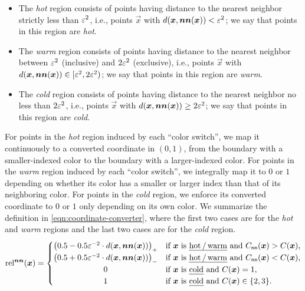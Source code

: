 \begin{itemize}[itemsep=0.2em,topsep=0.5em]
    \item The {\em hot} region consists of points having distance to the nearest neighbor strictly less than $\varepsilon^2$, i.e., points $\vec{x}$ with $d(\boldsymbol{x}, \operatorname*{\boldsymbol{nn}}(\boldsymbol{x}))<\varepsilon^2$; we say that points in this region are {\em hot}.
    \item The {\em warm} region consists of points having distance to the nearest neighbor between $\varepsilon^2$ (inclusive) and $2\varepsilon^2$ (exclusive), i.e., points $\vec{x}$ with $d(\boldsymbol{x}, \operatorname*{\boldsymbol{nn}}(\boldsymbol{x}))\in [\varepsilon^2,2\varepsilon^2)$; we say that points in this region are {\em warm}.
    \item The {\em cold} region consists of points having distance to the nearest neighbor no less than $2\varepsilon^2$, i.e., points $\vec{x}$ with $d(\boldsymbol{x}, \operatorname*{\boldsymbol{nn}}(\boldsymbol{x}))\geq 2\varepsilon^2$; we say that points in this region are {\em cold}.
\end{itemize}
For points in the {\em hot} region induced by each ``color switch'', 
we map it continuously to a converted coordinate in $(0,1)$, from the boundary with a smaller-indexed color to the boundary with a larger-indexed color.
For points in the {\em warm} region induced by each ``color switch'', we integrally map it to $0$ or $1$ depending on whether its color has a smaller or larger index than that of its neighboring color.
For points in the {\em cold} region, we enforce its converted coordinate to $0$ or $1$ only depending on its own color. 
We summarize the definition in \cref{eqn:coordinate-converter}, where the first two cases are for the {\em hot} and {\em warm} regions and the last two cases are for the {\em cold} region.
\begin{align}
    \label{eqn:coordinate-converter}
    \rel(\vec{x}) = \begin{cases}
        \hfill \left(0.5 - 0.5\eps^{-2} \cdot d(\vec{x}, \vec{nn}(\vec{x}))
        \right)_+ \hfill & \text{if $\vec{x}$ is {\em hot\,/\,warm} and $C_{\sf nn}(\vec{x})>C(\vec{x})$,}\\
        \left(0.5 + 0.5\eps^{-2} \cdot d(\vec{x}, \vec{nn}(\vec{x}))\right)_- & \text{if $\vec{x}$ is {\em hot\,/\,warm} and $C_{\sf nn}(\vec{x})<C(\vec{x})$,}\\
        \hfill 0 \hfill & \text{if $\vec{x}$ is {\em cold} and $C(\vec{x})=1$,}\\
        \hfill 1 \hfill & \text{if $\vec{x}$ is {\em cold} and $C(\vec{x})\in \{2,3\}$.}
    \end{cases}
\end{align}
